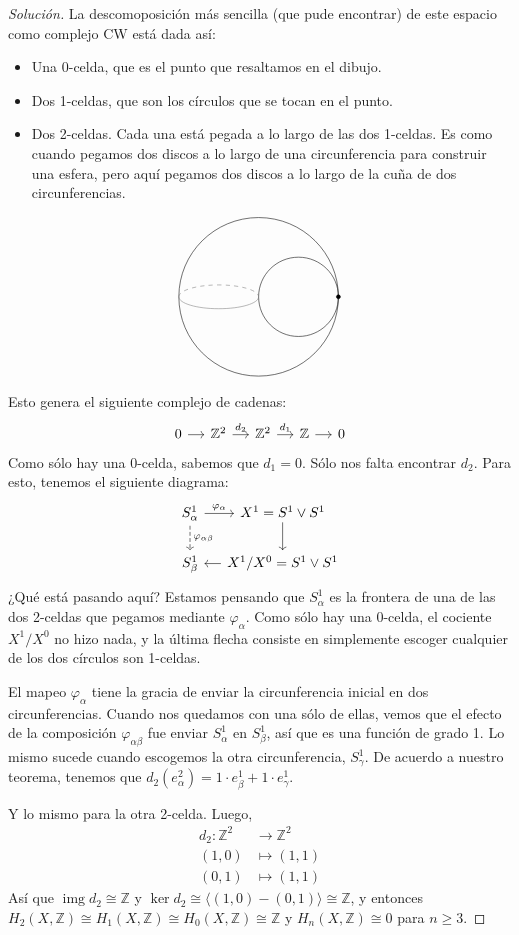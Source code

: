 \documentclass[spanish]{book}
\theoremstyle{definition}
\newcommand{\Z}{\mathbb{Z}}
\DeclareMathOperator{\img}{img}
\begin{document}
	\begin{proof}[Solución]
	La descomoposición más sencilla (que pude encontrar) de este espacio como complejo CW está dada así:
		\begin{itemize}
		\item Una 0-celda, que es el punto que resaltamos en el dibujo.
		\item Dos 1-celdas, que son los círculos que se tocan en el punto.
		\item Dos 2-celdas. Cada una está pegada a lo largo de las dos 1-celdas. Es como cuando pegamos dos discos a lo largo de una circunferencia para construir una esfera, pero aquí pegamos dos discos a lo largo de la cuña de dos circunferencias.
	\end{itemize}
	\[\begin{tikzpicture}
		\draw (0,0) circle (2);
		
		\draw (1,0) circle (1);
		
		\draw[gray] (-2,0) arc (180:360:1 and 0.3);
		\draw[gray,dashed] (-2,0) arc (180:0:1 and 0.3);
		
		\filldraw (2,0) circle (0.05);
	\end{tikzpicture}\]
	Esto genera el siguiente complejo de cadenas:
	\[\begin{tikzcd}[column sep=small]
		0\arrow[r]&\Z^2\arrow[r,"d_2"]&\Z^2\arrow[r,"d_1"]&\Z\arrow[r]&0
	\end{tikzcd}\]
	Como sólo hay una 0-celda, sabemos que $d_1=0$. Sólo nos falta encontrar $d_2$. Para esto, tenemos el siguiente diagrama:
	\[\begin{tikzcd}[column sep=small]
		S^1_\alpha\arrow[r,"\varphi_\alpha"]\arrow[d,dashed,"\varphi_{\alpha\beta}"]&X^1=S^1\vee S^1\arrow[d]\\
		S^1_\beta&X^1/X^0=S^1\vee S^1\arrow[l]
	\end{tikzcd}\]
	¿Qué está pasando aquí? Estamos pensando que $S^1_\alpha$ es la frontera de una de las dos 2-celdas que pegamos mediante $\varphi_\alpha$. Como sólo hay una 0-celda, el cociente $X^1/X^0$ no hizo nada, y la última flecha consiste en simplemente escoger cualquier de los dos círculos son 1-celdas.
	
	El mapeo $\varphi_\alpha$ tiene la gracia de enviar la circunferencia inicial en dos circunferencias. Cuando nos quedamos con una sólo de ellas, vemos que el efecto de la composición $\varphi_{\alpha\beta}$ fue enviar $S^1_\alpha$ en $S^1_\beta$, así que es una función de grado 1. Lo mismo sucede cuando escogemos la otra circunferencia, $S^1_\gamma$. De acuerdo a nuestro teorema, tenemos que $d_2(e^2_\alpha)=1\cdot e^1_\beta+1\cdot e^1_\gamma$.
	
	Y lo mismo para la otra 2-celda. Luego,
	\begin{align*}
		d_2:\Z^2&\to\Z^2\\
		(1,0)&\mapsto (1,1)\\
		(0,1)&\mapsto (1,1)
	\end{align*}
	Así que $\img d_2\cong\Z$ y $\ker d_2\cong\langle (1,0)-(0,1)\rangle\cong\Z$, y entonces $H_2(X,\Z)\cong H_1(X,\Z)\cong H_0(X,\Z)\cong\Z$ y $H_n(X,\Z)\cong0$ para $n\geq3$.
\end{proof}
\end{document}

